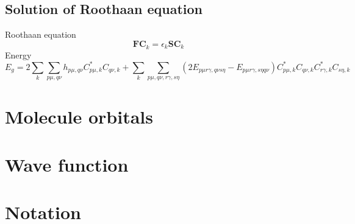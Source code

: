 \documentclass{article}
\begin{document}

    \subsection{Solution of Roothaan equation}
        Roothaan equation
        \begin{equation}
            \textbf{FC}_k = \epsilon_k\textbf{SC}_k
        \end{equation}
        Energy
        \begin{equation}
            E_g = 2\sum_k\sum_{p\mu,q\nu}h_{p\mu,q\nu}C_{p\mu,k}^*C_{q\nu,k}+
            \sum_k\sum_{p\mu,q\nu,r\gamma,s\eta}(2E_{p\mu r\gamma,q\nu s\eta}-
            E_{p\mu r\gamma,s\eta q\nu})C_{p\mu,k}^*C_{q\nu,k}C_{r\gamma,k}^*C_{s\eta,k}
        \end{equation}
        
\section{Molecule orbitals}

\section{Wave function}




\section*{Notation}
\end{document}
